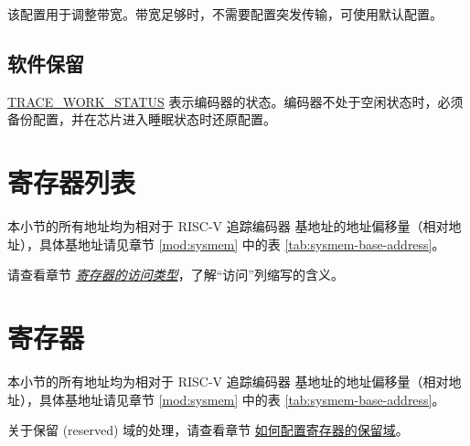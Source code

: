 \documentclass[main\_\_CN.tex]{subfiles}
\begin{document}
该配置用于调整带宽。带宽足够时，不需要配置突发传输，可使用默认配置。

\subsection{软件保留}

\hyperref[fielddesc:TRACEWORKSTATUS]{TRACE\_WORK\_STATUS} 表示编码器的状态。编码器不处于空闲状态时，必须备份配置，并在芯片进入睡眠状态时还原配置。




\newpage
\hypertarget{riscvtracenc-reg-summ}{}
\section{寄存器列表}
\label{sec:riscvtracenc-reg-summ}

本小节的所有地址均为相对于 RISC-V 追踪编码器 基地址的地址偏移量（相对地址），具体基地址请见章节 \ref{mod:sysmem} \textit{} 中的表 \ref{tab:sysmem-base-address}。

请查看章节 \hyperref[glossary-access-types]{\textit{寄存器的访问类型}}，了解“访问”列缩写的含义。






\newpage
\section{寄存器}

本小节的所有地址均为相对于 RISC-V 追踪编码器 基地址的地址偏移量（相对地址），具体基地址请见章节 \ref{mod:sysmem} \textit{} 中的表 \ref{tab:sysmem-base-address}。

关于保留 (reserved) 域的处理，请查看章节 \hyperref[programming-reserved-field]{如何配置寄存器的保留域}。



\end{document}
